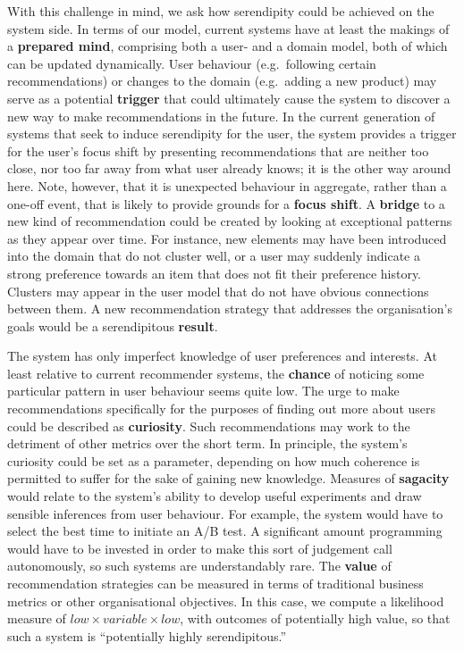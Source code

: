 With this challenge in mind, we ask how serendipity could be achieved on the system side. In terms of our model, current systems have at least the makings of a \textbf{prepared mind}, comprising both a user- and a domain model, both of which can be updated dynamically.  User behaviour (e.g.~following certain recommendations) or changes to the domain (e.g.~adding a new product) may serve as a potential \textbf{trigger} that could ultimately cause the system to discover a new way to make recommendations in the future.  
In the current generation of systems that seek to induce serendipity for the user, the system provides a trigger for the user's focus shift by presenting recommendations that are neither too close, nor too far away from what user already knows; it is the other way around here. Note, however, that it is unexpected behaviour in aggregate, rather than a one-off event, that is likely to provide grounds for a \textbf{focus shift}.   
A \textbf{bridge} to a new kind of recommendation could be created by looking at exceptional patterns as they appear over time.  For instance, new elements may have been introduced into the domain that do not cluster well, or a user may suddenly indicate a strong preference towards an item that does not fit their preference history.  Clusters may appear in the user model that do not have obvious connections between them.  A new recommendation strategy that addresses the organisation's goals would be a serendipitous \textbf{result}.

The system has only imperfect knowledge of user preferences and
interests.  At least relative to current recommender systems, the
\textbf{chance} of noticing some particular pattern in user behaviour
seems quite low.  The urge to make recommendations specifically for
the purposes of finding out more about users could be described as
\textbf{curiosity}.  Such recommendations may work to the detriment of
other metrics over the short term.  In principle, the system's
curiosity could be set as a parameter, depending on how much coherence
is permitted to suffer for the sake of gaining new knowledge.
Measures of \textbf{sagacity} would relate to the system's ability to
develop useful experiments and draw sensible inferences from user
behaviour.  For example, the system would have to select the best time
to initiate an A/B test.  A significant amount programming would have
to be invested in order to make this sort of judgement call
autonomously, so such systems are understandably rare.  The
\textbf{value} of recommendation strategies can be measured in terms
of traditional business metrics or other organisational objectives.
In this case, we compute a likelihood measure of
$\mathit{low}\times\mathit{variable}\times\mathit{low}$, with outcomes
of potentially high value, so that such a system is ``potentially
highly serendipitous.''

